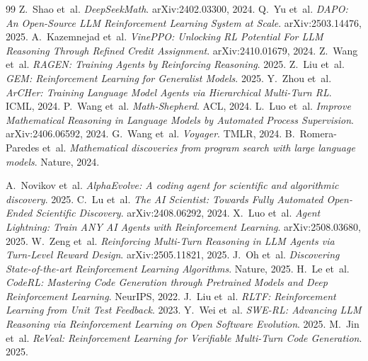 \documentclass[11pt,a4paper]{article}
\begin{document}


\begin{thebibliography}{99}
 Z.~Shao et~al.
\emph{DeepSeekMath}. arXiv:2402.03300, 2024.
 Q.~Yu et~al.
\emph{DAPO: An Open-Source LLM Reinforcement Learning System at
Scale}. arXiv:2503.14476, 2025.
 A.~Kazemnejad et~al.
\emph{VinePPO: Unlocking RL Potential For LLM Reasoning Through
Refined Credit Assignment}. arXiv:2410.01679, 2024.
 Z.~Wang et~al. \emph{RAGEN: Training Agents
by Reinforcing Reasoning}. 2025.
 Z.~Liu et~al. \emph{GEM: Reinforcement Learning
for Generalist Models}. 2025.
 Y.~Zhou et~al. \emph{ArCHer: Training
Language Model Agents via Hierarchical Multi-Turn RL}. ICML, 2024.
 P.~Wang et~al. \emph{Math-Shepherd}.
ACL, 2024.
 L.~Luo et~al. \emph{Improve Mathematical
Reasoning in Language Models by Automated Process Supervision}.
arXiv:2406.06592, 2024.
 G.~Wang et~al. \emph{Voyager}. TMLR, 2024.
 B.~Romera-Paredes et~al.
\emph{Mathematical discoveries from program search with large
language models}. Nature, 2024.

 A.~Novikov et~al.
\emph{AlphaEvolve: A coding agent for scientific and algorithmic discovery}. 2025.
 C.~Lu et~al.
\emph{The AI Scientist: Towards Fully Automated Open-Ended Scientific Discovery}. arXiv:2408.06292, 2024.
 X.~Luo et~al.
\emph{Agent Lightning: Train ANY AI Agents with Reinforcement Learning}. arXiv:2508.03680, 2025.
 W.~Zeng et~al.
\emph{Reinforcing Multi-Turn Reasoning in LLM Agents via Turn-Level Reward Design}. arXiv:2505.11821, 2025.
 J.~Oh et~al.
\emph{Discovering State-of-the-art Reinforcement Learning Algorithms}. Nature, 2025.
 H.~Le et~al.
\emph{CodeRL: Mastering Code Generation through Pretrained Models and Deep Reinforcement Learning}. NeurIPS, 2022.
 J.~Liu et~al.
\emph{RLTF: Reinforcement Learning from Unit Test Feedback}. 2023.
 Y.~Wei et~al.
\emph{SWE-RL: Advancing LLM Reasoning via Reinforcement Learning on Open Software Evolution}. 2025.
 M.~Jin et~al.
\emph{ReVeal: Reinforcement Learning for Verifiable Multi-Turn Code Generation}. 2025.
\end{thebibliography}
\end{document}
